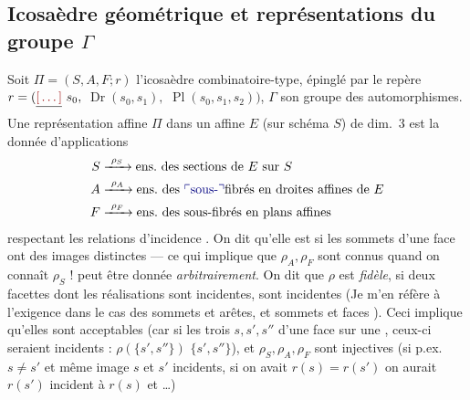 \documentclass[11pt,a4paper]{article}
\begin{document}
\subsection{Icosaèdre géométrique et représentations du groupe $\Gamma$}

Soit $\Pi = (S, A, F; r)$ l'icosaèdre combinatoire-type, épinglé par le repère $r = (\struck{\ill{}}\ s_0,$ $\operatorname{Dr}(s_0, s_1),$ $\operatorname{Pl}(s_0, s_1, s_2))$, $\Gamma$ son groupe des automorphismes. Une représentation  affine   $\Pi$ dans un \struck{\ill{}}  affine $E$ (sur schéma $S$) de dim.\ 3 est la donnée d'applications
\[
\begin{aligned}
S &\xrightarrow{\ \rho_S\ } \text{ens.\ des sections de } E \text{ sur } S \\
A &\xrightarrow{\ \rho_A\ } \text{ens.\ des \add{sous-}fibrés en droites affines de } E \\
F &\xrightarrow{\ \rho_F\ } \text{ens.\ des sous-fibrés en plans affines}
\end{aligned}
\]
respectant les relations d'incidence . On dit qu'elle est    si \struck{\ill{}} les sommets d'une face ont des images distinctes  — ce qui implique que $\rho_A, \rho_F$ sont connus quand on connaît $\rho_S$ !    \ill{} peut être donnée \emph{arbitrairement}. On dit que $\rho$ est \emph{fidèle}, si     deux facettes dont les réalisations  sont incidentes, sont incidentes \struck{\ill{}}
(Je m'en réfère à l'exigence dans le cas des sommets et arêtes, et sommets et faces \ill{}).
Ceci implique qu'elles sont acceptables (car si les trois  $s, s', s''$ d'une face  sur une , ceux-ci seraient incidents : $\rho(\{s', s''\})$ \ill{} \ill{} $\{s', s''\}$), et $\rho_S, \rho_A, \rho_F$ sont injectives (si p.ex.\ $s \neq s'$ et  même image \ill{} \ill{} \ill{} $s$ et $s'$  incidents, si on avait $r(s) = r(s')$ on aurait $r(s')$ incident à $r(s)$ et \ill{} \ill{}\ldots)
\end{document}
